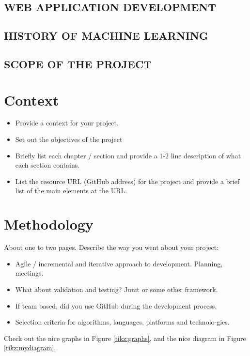 \section{WEB APPLICATION DEVELOPMENT}

\section{HISTORY OF MACHINE LEARNING}
\section{SCOPE OF THE PROJECT}

\chapter{Context}
\begin{itemize}
\item Provide a context for your project.
\item Set out the objectives of the project
\item Briefly list each chapter / section and provide a 1-2 line description of what each section contains.
\item List the resource URL (GitHub address) for the project and provide a brief list of the main elements at the URL.
\end{itemize}



\chapter{Methodology}
About one to two pages.
Describe the way you went about your project:
\begin{itemize}
\item Agile / incremental and iterative approach to development. Planning, meetings.
\item What about validation and testing? Junit or some other framework.
\item If team based, did you use GitHub during the development process.
\item Selection criteria for algorithms, languages, platforms and technolo-gies.
\end{itemize}
Check out the nice graphs in Figure \ref{tikz:graphs}, and the nice diagram in Figure \ref{tikz:mydiagram}.

